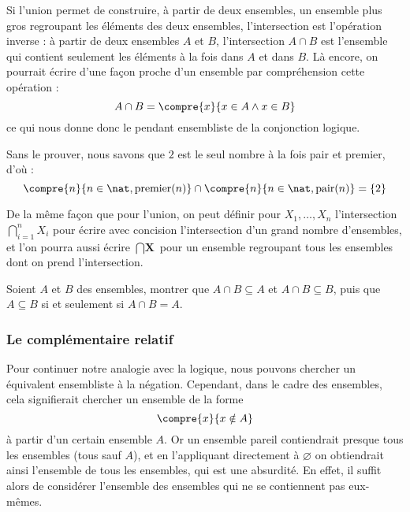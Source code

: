 Si l'union permet de construire, à partir de deux ensembles, un ensemble plus gros regroupant les éléments des deux ensembles, l'intersection est l'opération inverse : à partir de deux ensembles $A$ et $B$, l'intersection $A\cap B$ est l'ensemble qui contient seulement les éléments à la fois dans $A$ et dans $B$. Là encore, on pourrait écrire d'une façon proche d'un ensemble par compréhension cette opération :
$$A\cap B = \compre{x}{x\in A \land x \in B}
$$
ce qui nous donne donc le pendant ensembliste de la conjonction logique.

\begin{expl}
    Sans le prouver, nous savons que $2$ est le seul nombre à la fois pair et premier, d'où : $$\compre{n}{n\in\nat, \mathrm{premier}(n)}\cap\compre{n}{n\in\nat, \mathrm{pair}(n)}=\{2\}$$
\end{expl}


\begin{rmk}
    De la même façon que pour l'union, on peut définir pour $X_1,\ldots,X_n$ l'intersection $\displaystyle{\bigcap_{i=1}^nX_i}$ pour écrire avec concision l'intersection d'un grand nombre d'ensembles, et l'on pourra aussi écrire $\displaystyle{\bigcap \textbf{X}}$ pour un ensemble regroupant tous les ensembles dont on prend l'intersection.
\end{rmk}

\begin{exo}
    Soient $A$ et $B$ des ensembles, montrer que $A\cap B\subseteq A$ et $A\cap B \subseteq B$, puis que $A\subseteq B$ si et seulement si $A\cap B = A$.
\end{exo}

\subsubsection{Le complémentaire relatif}

Pour continuer notre analogie avec la logique, nous pouvons chercher un équivalent ensembliste à la négation. Cependant, dans le cadre des ensembles, cela signifierait chercher un ensemble de la forme $$\compre{x}{x\notin A}$$ à partir d'un certain ensemble $A$. Or un ensemble pareil contiendrait presque tous les ensembles (tous sauf $A$), et en l'appliquant directement à $\varnothing$ on obtiendrait ainsi l'ensemble de tous les ensembles, qui est une absurdité. En effet, il suffit alors de considérer l'ensemble des ensembles qui ne se contiennent pas eux-mêmes.

